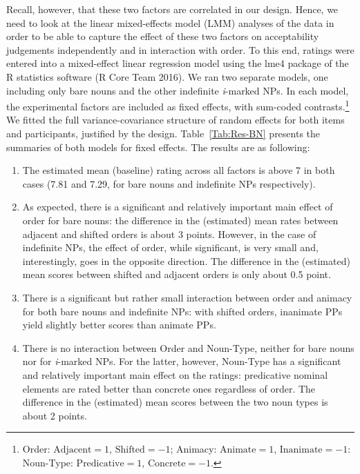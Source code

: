 \documentclass[output=paper]{langsci/langscibook}
\begin{document}
Recall, however, that these two factors are correlated in our design. Hence, we need to look at the linear mixed-effects model (LMM) analyses of the data \citep{baayen2008mixed} in order to be able to capture the effect of these two factors on acceptability judgements independently and in interaction with order. To this end, ratings were entered into a mixed-effect linear regression model using the lme4 package \citep{bates2015lme4} of the R statistics software (R Core Team 2016). We ran two separate models, one including only bare nouns and the other indefinite \textit{i}-marked NPs. In each model, the experimental factors are included as fixed effects, with sum-coded contrasts.\footnote{Order: $\text{Adjacent}=1$, $\text{Shifted}=-1$; Animacy: $\text{Animate}=1$, $\text{Inanimate}=-1$: Noun-Type: $\text{Predicative}=1$, $\text{Concrete}=-1$.} We fitted the full variance-covariance structure of random effects for both items and participants, justified by the design.  
Table~\ref{Tab:Res-BN} presents the summaries of both models for fixed effects. The results are as following:

\begin{enumerate}
	\item The estimated mean (baseline) rating across all factors is above 7 in both cases (7.81 and 7.29, for bare nouns and indefinite NPs respectively).
	
	\item As expected, there is a significant and relatively important main effect of order for bare nouns: the difference in the (estimated) mean rates between adjacent and shifted orders is about 3 points. 
	However, in the case of indefinite NPs, the effect of order, while significant, is very small and, interestingly, goes in the opposite direction. The difference in the (estimated) mean scores between shifted and adjacent orders is only about 0.5 point. 
	
	\item There is a significant but rather small interaction between order and animacy for both bare nouns and indefinite NPs: with shifted orders, inanimate PPs yield slightly better scores than animate PPs.  
	
	\item There is no interaction between Order and Noun-Type, neither for bare nouns nor for \textit{i}-marked NPs. For the latter, however, Noun-Type has a significant and relatively important main effect on the ratings: predicative nominal elements are rated better than concrete ones regardless of order. The difference in the (estimated) mean  scores between the two noun types is about 2 points.
\end{enumerate}
\end{document}
